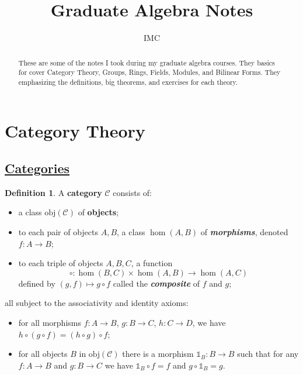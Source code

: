 \documentclass[11pt]{amsart}
\title{Graduate Algebra Notes}
\author{\vspace{-10pt}IMC}
\theoremstyle{definition}
\newtheorem*{definition*}{Definition}
\renewcommand\:{\colon}
\newcommand{\calC}{\mathcal{C}}
\newcommand{\1}{\mathds{1}}
\newcommand{\obj}{\text{obj}}
\begin{document}
\begin{abstract}
	\vspace{-10pt}These are some of the notes I took during my graduate algebra courses. They basics for cover Category Theory, Groups, Rings, Fields, Modules, and Bilinear Forms. They emphasizing the definitions, big theorems, and exercises for each theory.
\end{abstract}

\maketitle
\vspace{-15pt}

\setcounter{tocdepth}{1}
\tableofcontents
\vspace{-10pt}



\section{Category Theory}

\subsection*{\underline{Categories}}

\begin{definition*}
	A \textbf{category} $\calC$ consists of: 
	\begin{itemize}[leftmargin=12.5pt]\setlength\itemsep{0em}
		\item a class $\obj(\calC)$ of \textbf{objects}; 
		\item to each pair of objects $A, B$, a class $\hom(A, B)$ of \textbf{\textit{morphisms}}, denoted $f\: A \to B$;
		\item to each triple of objects $A, B, C$, a function $$\circ\: \hom(B, C) \times \hom(A, B) \to \hom(A, C)$$ defined by $(g, f) \mapsto g \circ f$ called the \textbf{\textit{composite}} of $f$ and $g$;
	\end{itemize}
	all subject to the associativity and identity axioms:
	\begin{itemize}[leftmargin=12.5pt]\setlength\itemsep{0em}
		\item for all morphisms $f\: A \to B$, $g\: B \to C$, $h\: C \to D$, we have $h \circ (g \circ f) = (h \circ g) \circ f$;
		\item for all objects $B$ in $\obj(\calC)$ there is a morphism $\1_B\: B \to B$ such that for any $f\: A \to B$ and $g\: B \to C$ we have $\1_B \circ f = f$ and $g \circ \1_B = g$.
	\end{itemize}
\end{definition*}
\end{document}
